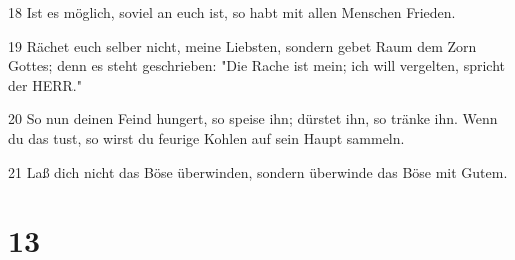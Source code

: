 \par 18 Ist es möglich, soviel an euch ist, so habt mit allen Menschen Frieden.
\par 19 Rächet euch selber nicht, meine Liebsten, sondern gebet Raum dem Zorn Gottes; denn es steht geschrieben: "Die Rache ist mein; ich will vergelten, spricht der HERR."
\par 20 So nun deinen Feind hungert, so speise ihn; dürstet ihn, so tränke ihn. Wenn du das tust, so wirst du feurige Kohlen auf sein Haupt sammeln.
\par 21 Laß dich nicht das Böse überwinden, sondern überwinde das Böse mit Gutem.

\chapter{13}

